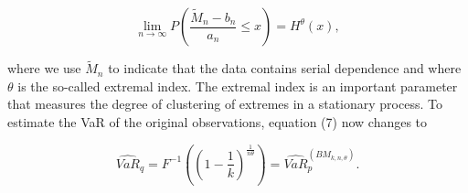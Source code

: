 \begin{equation}
    \lim_{n\to\infty} P\left(\frac{\tilde{M}_n-b_n}{a_n}\leq x\right)=H^{\theta}\left(x\right),
\end{equation}

\noindent where we use $\tilde{M}_n$ to indicate that the data contains serial dependence and where $\theta$ is the so-called extremal index. The extremal index is an important parameter that measures the degree of clustering of extremes in a stationary process. To estimate the VaR of the original observations, equation (7) now changes to

\begin{equation}
    \widehat{VaR}_q = F^{-1}\left(\left(1-\frac{1}{k}\right)^{\frac{1}{n\theta}}\right) = \widehat{VaR}_p^{(BM_{k,n,\theta})}.
\end{equation}
